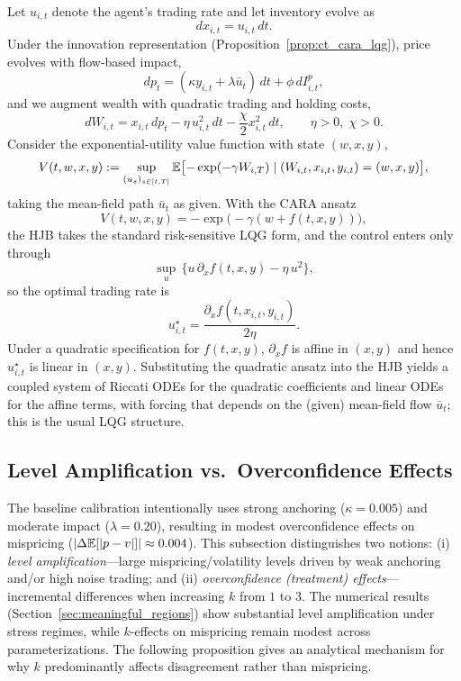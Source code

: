 Let $u_{i,t}$ denote the agent's trading rate and let inventory evolve as
\begin{equation}
dx_{i,t}=u_{i,t}\,dt.
\end{equation}
Under the innovation representation (Proposition~\ref{prop:ct_cara_lqg}), price evolves with flow-based impact,
\begin{equation}
dp_t = (\kappa y_{i,t}+\lambda \bar u_t)\,dt+\phi\,dI^p_{i,t},
\end{equation}
and we augment wealth with quadratic trading and holding costs,
\begin{equation}
dW_{i,t}=x_{i,t}\,dp_t-\eta\,u_{i,t}^2\,dt-\frac{\chi}{2}x_{i,t}^2\,dt,
\qquad \eta>0,\;\chi>0.
\end{equation}
Consider the exponential-utility value function with state $(w,x,y)$,
\[
V(t,w,x,y):=\sup_{(u_s)_{s\in[t,T]}} \mathbb{E}\bigl[-\exp(-\gamma W_{i,T})\mid (W_{i,t},x_{i,t},y_{i,t})=(w,x,y)\bigr],
\]
taking the mean-field path $\bar u_t$ as given. With the CARA ansatz
\[
V(t,w,x,y)=-\exp\bigl(-\gamma(w+f(t,x,y))\bigr),
\]
the HJB takes the standard risk-sensitive LQG form, and the control enters only through
\[
\sup_{u}\,\bigl\{u\,\partial_x f(t,x,y)-\eta\,u^2\bigr\},
\]
so the optimal trading rate is
\begin{equation}
u_{i,t}^\star=\frac{\partial_x f(t,x_{i,t},y_{i,t})}{2\eta}.
\end{equation}
Under a quadratic specification for $f(t,x,y)$, $\partial_x f$ is affine in $(x,y)$ and hence $u_{i,t}^\star$ is linear in $(x,y)$. Substituting the quadratic ansatz into the HJB yields a coupled system of Riccati ODEs for the quadratic coefficients and linear ODEs for the affine terms, with forcing that depends on the (given) mean-field flow $\bar u_t$; this is the usual LQG structure.

\subsection{Level Amplification vs.\ Overconfidence Effects}
\label{subsec:amplification}

The baseline calibration intentionally uses strong anchoring ($\kappa=0.005$) and moderate impact ($\lambda=0.20$), resulting in modest overconfidence effects on mispricing ($|\Delta \mathbb{E}[|p-v|]| \approx 0.004$). This subsection distinguishes two notions: (i) \emph{level amplification}---large mispricing/volatility levels driven by weak anchoring and/or high noise trading; and (ii) \emph{overconfidence (treatment) effects}---incremental differences when increasing $k$ from $1$ to $3$. The numerical results (Section~\ref{sec:meaningful_regions}) show substantial level amplification under stress regimes, while $k$-effects on mispricing remain modest across parameterizations. The following proposition gives an analytical mechanism for why $k$ predominantly affects disagreement rather than mispricing.

